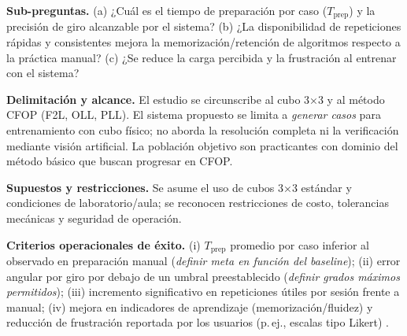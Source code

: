 \textbf{Sub-preguntas.} 
(a) ¿Cuál es el tiempo de preparación por caso (\(T_{\mathrm{prep}}\)) y la precisión de giro alcanzable por el sistema? 
(b) ¿La disponibilidad de repeticiones rápidas y consistentes mejora la memorización/retención de algoritmos respecto a la práctica manual? 
(c) ¿Se reduce la carga percibida y la frustración al entrenar con el sistema?

\textbf{Delimitación y alcance.} El estudio se circunscribe al cubo 3×3 y al método CFOP (F2L, OLL, PLL). El sistema propuesto se limita a \emph{generar casos} para entrenamiento con cubo físico; no aborda la resolución completa ni la verificación mediante visión artificial. La población objetivo son practicantes con dominio del método básico que buscan progresar en CFOP.

\textbf{Supuestos y restricciones.} Se asume el uso de cubos 3×3 estándar y condiciones de laboratorio/aula; se reconocen restricciones de costo, tolerancias mecánicas y seguridad de operación.

\textbf{Criterios operacionales de éxito.} 
(i) \(T_{\mathrm{prep}}\) promedio por caso inferior al observado en preparación manual (\textit{definir meta en función del baseline}); 
(ii) error angular por giro por debajo de un umbral preestablecido (\textit{definir grados máximos permitidos}); 
(iii) incremento significativo en repeticiones útiles por sesión frente a manual; 
(iv) mejora en indicadores de aprendizaje (memorización/fluidez) y reducción de frustración reportada por los usuarios (p.\,ej., escalas tipo Likert) \cite{Boyce2022}.